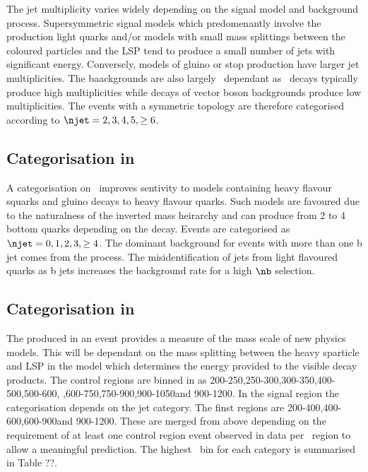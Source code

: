 The jet multiplicity varies widely depending on the signal model and background process.
Supersymmetric signal models which predomenantly involve the production light quarks and/or models 
with small mass splittings between the coloured particles and the LSP tend to produce 
a small number of jets with significant energy. Conversely, models of gluino or stop production
have larger jet multiplicities. The baackgrounds are also largely \njet~dependant as 
\ttbar~decays typically produce high multiplicities while decays of vector boson backgrounds
produce low multiplicities. The events with a symmetric topology are therefore categorised according
to $\njet = 2,3,4,5,\ge6$.

\subsection{Categorisation in \nb}

A categorisation on \nb~improves sentivity to models containing heavy flavour squarks and gluino
decays to heavy flavour quarks. Such models are favoured due to the naturalness of the
inverted mass heirarchy and can produce from 2 to 4 bottom quarks depending on the decay.
Events are categorised as $\njet = 0,1,2,3,\ge4$. The dominant background for events 
with more than one b jet comes from the \ttbar process. The misidentification of 
jets from light flavoured quarks as b jets increases the background rate for a high $\nb$ selection.

\subsection{Categorisation in \scalht}

The \scalht produced in an event provides a measure of the mass scale of 
new physics models. This will be dependant on the mass splitting between
the heavy sparticle and LSP in the model which determines the energy
provided to the visible decay products. The control regions are binned
in \scalht as 200-250\GeV,250-300\GeV,300-350\GeV,400-500\GeV,500-600\GeV,
,600-750\GeV,750-900\GeV,900-1050\GeV and 900-1200\GeV. In the signal region
the \scalht categorisation depends on the jet category. The finst \scalht
regions are 200-400\GeV,400-600\GeV,600-900\GeV and 900-1200\GeV.
These are merged from above depending on the requirement of at least one control region
event observed in data per \scalht~region to allow a meaningful prediction.
The highest \scalht~bin for each category is summarised in Table ??.


